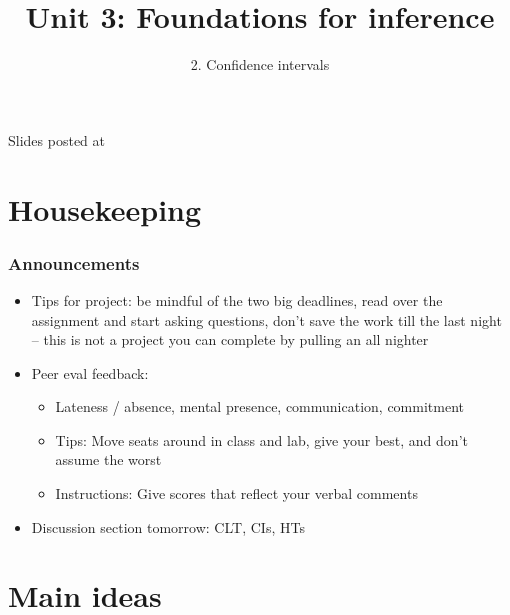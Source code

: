 \documentclass[slidestop,compress,mathserif,12pt,t,professionalfonts,xcolor=table]{beamer}
\title{Unit 3: Foundations for inference}
\subtitle{2. Confidence intervals}
\author{\CourseName}
\date{}
\institute{\InstituteName}
\begin{document}



\begin{frame}[plain]

\titlepage

\vfill

{\scriptsize {} \hfill Slides posted at  \webURL{\CourseSite}}

\addtocounter{framenumber}{-1} 

\end{frame}


\section{Housekeeping}


\begin{frame}
\frametitle{Announcements}

\begin{itemize}

\item Tips for project: be mindful of the two big deadlines, read over the assignment and start asking questions,
don't save the work till the last night -- this is not a project you can complete by pulling an all nighter

\item Peer eval feedback:
\begin{itemize}
\item Lateness / absence, mental presence, communication, commitment
\item Tips: Move seats around in class and lab, give your best, and don't assume the worst
\item Instructions: Give scores that reflect your verbal comments
\end{itemize}

\item Discussion section tomorrow: CLT, CIs, HTs

\end{itemize}

\end{frame}


\section{Main ideas}
\end{document}
